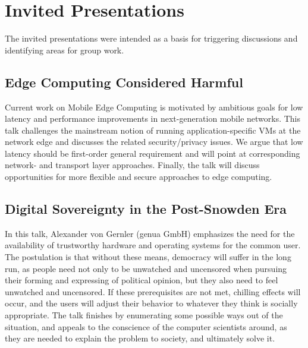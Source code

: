 \section{Invited Presentations}\label{sec:invited-presentations}

The invited presentations were intended as a basis for triggering discussions
and identifying areas for group work.

\subsection{Edge Computing Considered Harmful}

Current work on Mobile Edge Computing is motivated by ambitious goals
for low latency and performance improvements in next-generation mobile
networks. This talk challenges the mainstream notion of running
application-specific VMs at the network edge and discusses the related
security/privacy issues. We argue that low latency should be first-order
general requirement and will point at corresponding network- and
transport layer approaches. Finally, the talk will discuss opportunities
for more flexible and secure approaches to edge computing.


\subsection{Digital Sovereignty in the Post-Snowden Era}

In this talk, Alexander von Gernler (genua GmbH) emphasizes the need for the
availability of trustworthy hardware and operating systems for the common
user.  The postulation is that without these means, democracy will suffer in
the long run, as people need not only to be unwatched and uncensored when
pursuing their forming and expressing of political opinion, but they also need
to feel unwatched and uncensored.  If these prerequisites are not met,
chilling effects will occur, and the users will adjust their behavior to
whatever they think is socially appropriate.  The talk finishes by enumerating
some possible ways out of the situation, and appeals to the conscience of the
computer scientists around, as they are needed to explain the problem to
society, and ultimately solve it.

